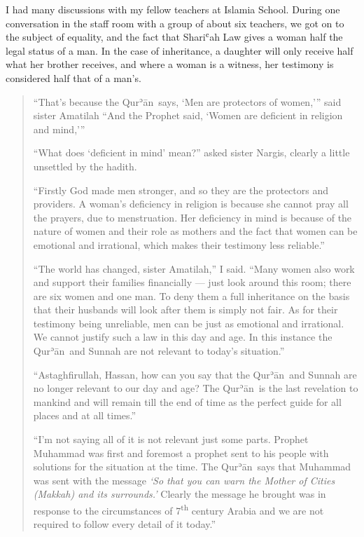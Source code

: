 \documentclass[12pt]{memoir}
\def\´{ʾ} %
\def\`{ʿ} %
\let \Sup=\textsuperscript
\newcommand{\cor}[2]{#2} %
\def \Quran{Qur\-\´ān} %
\begin{document}
I had many discussions with my fellow teachers at Islamia School.
During one conversation in the staff room with a group of about six teachers,
we got on to the subject of equality,
and the fact that Shari\`ah Law gives a woman half the legal status of a man.
In the case of inheritance, a daughter will only receive half
what her brother receives, and where a woman is a witness,
her testimony is considered half that of a man’s.

\begin{quote}
“That’s because the \Quran\ says, ‘Men are protectors of women,’”
said sister Amatilah
“And the Prophet said, ‘Women are deficient in religion and mind,’”

“What does ‘deficient in mind’ mean?” asked sister Nargis,
clearly a little unsettled by the hadith.

“Firstly God made men stronger, and so they are the protectors and providers.
A woman’s deficiency in religion is because
she cannot pray all the prayers, due to menstruation.
Her deficiency in mind is because of the nature of women and their role
as mothers and the fact that women can be emotional and irrational,
which makes their testimony less reliable.”

“The world has changed, sister Amatilah,” I said.
“Many women also work and support their families financially —
just look around this room; there are six women and one man.
To deny them a full inheritance on the basis that their husbands
will look after them is simply not fair.
As for their testimony being unreliable,
men can be just as emotional and irrational.
We cannot justify such a law in this day and age.
In this instance the \Quran\ and Sunnah
are not relevant to today’s situation.”

“Astaghfirullah, Hassan, how can you say that the \Quran\ and Sunnah
are no longer relevant to our day and age?
The \Quran\ is the last revelation to mankind and will remain
till the end of time as the perfect guide for all places and at all times.”

“I’m not saying all of it is not relevant just some parts.
Prophet Muhammad was first and foremost a prophet
sent to his people with solutions for the situation at the time.
The \Quran\ says that Muhammad was sent with the message
\emph{‘So that you can warn the Mother of Cities (Makkah)
and it\cor{’}{}s surrounds.’}
Clearly the message he brought was in response
to the circumstances of 7\Sup{th} century Arabia
and we are not required to follow every detail of it today.”


\end{quote}
\end{document}
